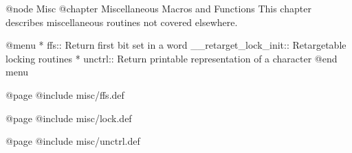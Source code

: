 @node Misc
@chapter Miscellaneous Macros and Functions
This chapter describes miscellaneous routines not covered elsewhere.

@menu 
* ffs::      Return first bit set in a word
 __retarget_lock_init::     Retargetable locking routines
* unctrl::   Return printable representation of a character
@end menu

@page
@include misc/ffs.def

@page
@include misc/lock.def

@page
@include misc/unctrl.def
